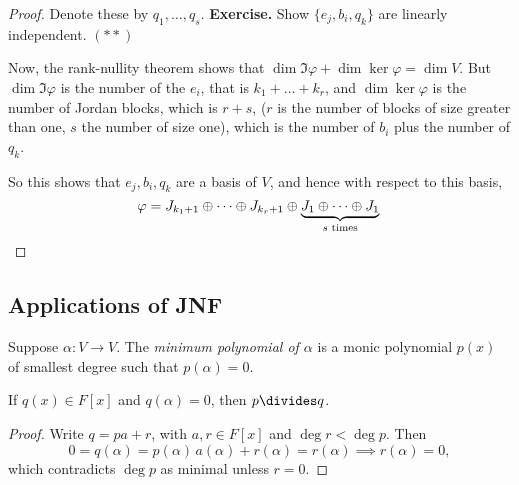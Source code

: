 \begin{proof}
	Denote these by $q_1,\ldots,q_s$. \textbf{Exercise.} Show $\{e_j,b_i,q_k\}$ are linearly independent. \hfill $(**)$
	
	Now, the rank-nullity theorem shows that $\dim \Im \varphi + \dim \ker \varphi = \dim V$. But $\dim \Im\varphi $ is the number of the $e_i$, that is $k_1 + \dots + k_r$, and $\dim \ker \varphi$ is the number of Jordan blocks, which is $r + s$, ($r$ is the number of blocks of size greater than one, $s$ the number of size one), which is the number of $b_i$ plus the number of $q_k$.


	So this shows that $e_j,b_i,q_k$ are a basis of $V$, and hence with respect to this basis,
	\begin{equation*}
		\varphi = J_{k_1+1} \oplus \cdots \oplus J_{k_r+1} \oplus \underbrace{J_1 \oplus \cdots \oplus J_1}_{s \text{ times}} \qedhere
	\end{equation*}
\end{proof}


	\pagebreak

\subsection{Applications of JNF}  %
\label{sub:applications_of_jnf}

\begin{definition}
	Suppose $\alpha:V\to V$. The \emph{minimum polynomial of $\alpha$} is a monic polynomial $p(x)$ of smallest degree such that $p(\alpha)=0$.
\end{definition}

\begin{lemma}
	If $q(x)\in F[x]$ and $q(\alpha)=0$, then $p\divides q$.
\end{lemma}

\begin{proof}
	Write $q=pa+r$, with $a,r\in F[x]$ and $\deg r < \deg p$. Then
	\begin{equation*}
		0 = q(\alpha) = p(\alpha)\,a(\alpha) + r(\alpha) = r(\alpha)
		\implies r(\alpha)=0,
	\end{equation*}
	which contradicts $\deg p$ as minimal unless $r=0$.
\end{proof}

